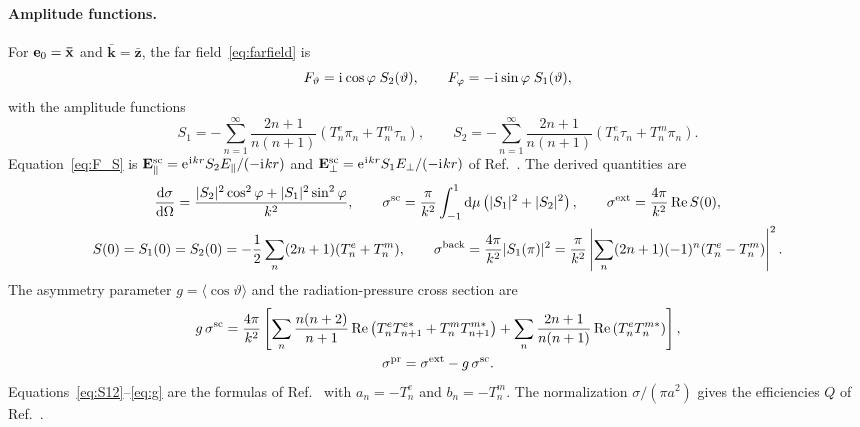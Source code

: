 \documentclass[
    pra,
    aps,
    reprint,
    onecolumn,
    amsmath,amssymb,
    a4paper,
    superscriptaddress,
    10pt,
    nofootinbib
]{revtex4-2}
\newcommand{\iu}{\mathrm{i}\mkern1mu}                 %
\newcommand{\eu}{\mathrm{e}\mkern1mu}                 %
\newcommand{\ort}[1]{\boldsymbol{\mathbf{\bar{#1}}}}  %
\begin{document}
\paragraph{Amplitude functions.}
For $\vb{e}_0 = \ort{x}$ and $\ort{k} = \ort{z}$, the far field~\eqref{eq:farfield} is
\begin{equation}
    F_\vartheta = \iu\cos\varphi\; S_2(\vartheta), \qquad
    F_\varphi = -\iu\sin\varphi\; S_1(\vartheta),
    \label{eq:F_S}
\end{equation}
with the amplitude functions
\begin{equation}
    S_1 = -\sum_{n=1}^\infty\frac{2n+1}{n(n+1)}\left(T^e_n\pi_n + T^m_n\tau_n\right), \qquad
    S_2 = -\sum_{n=1}^\infty\frac{2n+1}{n(n+1)}\left(T^e_n\tau_n + T^m_n\pi_n\right).
    \label{eq:S12}
\end{equation}
Equation~\eqref{eq:F_S} is $\vb{E}^{\rm sc}_\parallel = \eu^{\iu kr}S_2 E_\parallel/(-\iu kr)$ and $\vb{E}^{\rm sc}_\perp = \eu^{\iu kr}S_1 E_\perp/(-\iu kr)$ of Ref.~\cite{Bohren1984}.
The derived quantities are
\begin{gather}
    \frac{\dd\sigma}{\dd\Omega} = \frac{|S_2|^2\cos^2\varphi + |S_1|^2\sin^2\varphi}{k^2}, \qquad
    \sigma^{\rm sc} = \frac{\pi}{k^2}\int_{-1}^{1}\dd\mu\left(|S_1|^2 + |S_2|^2\right), \qquad
    \sigma^{\rm ext} = \frac{4\pi}{k^2}\Re S(0),
    \label{eq:S_derived}
    \\
    S(0) = S_1(0) = S_2(0) = -\frac{1}{2}\sum_{n}(2n+1)(T^e_n + T^m_n), \qquad
    \sigma^{\rm back} = \frac{4\pi}{k^2}|S_1(\pi)|^2 = \frac{\pi}{k^2}\left|\sum_n(2n+1)(-1)^n(T^e_n - T^m_n)\right|^2 .
    \label{eq:sigma_back}
\end{gather}
The asymmetry parameter $g = \langle\cos\vartheta\rangle$ and the radiation-pressure cross section are
\begin{gather}
    g\,\sigma^{\rm sc} = \frac{4\pi}{k^2}\left[\sum_n\frac{n(n+2)}{n+1}\Re\left(T^e_n T^{e*}_{n+1} + T^m_n T^{m*}_{n+1}\right) + \sum_n\frac{2n+1}{n(n+1)}\Re\left(T^e_n T^{m*}_n\right)\right],
    \label{eq:g}
    \\
    \sigma^{\rm pr} = \sigma^{\rm ext} - g\,\sigma^{\rm sc} .
    \label{eq:sigma_pr}
\end{gather}
Equations~\eqref{eq:S12}--\eqref{eq:g} are the formulas of Ref.~\cite[Ch.~4]{Bohren1984} with $a_n = -T^e_n$ and $b_n = -T^m_n$.
The normalization $\sigma/(\pi a^2)$ gives the efficiencies $Q$ of Ref.~\cite{Bohren1984}.

\end{document}
